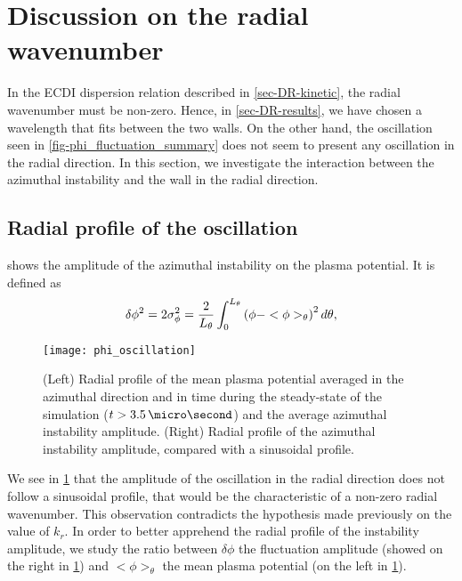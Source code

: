 
\section{ Discussion on the radial wavenumber}
  \label{sec-DR-BC}
    
  In the \ac{ECDI} dispersion relation described in \cref{sec-DR-kinetic}, the radial wavenumber must be non-zero.
  Hence, in \cref{sec-DR-results}, we have chosen a wavelength that fits between the two walls.
  On the other hand, the oscillation seen in \cref{fig-phi_fluctuation_summary} does not seem to present any oscillation in the radial direction.
  In this section, we investigate the interaction between the azimuthal instability and the wall in the radial direction.
  
  \subsection{Radial profile of the oscillation} \label{subsec-radial_prof}
   shows the amplitude of the azimuthal instability on the plasma potential.
  It is defined as
  \begin{equation} \label{eq-stdphi}
    \delta \phi^2 = 2 \sigma_{\phi}^2 = \frac{{2}}{L_{\theta}} \int_0^{L_{\theta}} \left(  \phi - <\phi>_{\theta}  \right) ^2 d\theta,
  \end{equation}
  
  \begin{figure}[hbt]
    \centering
    \texttt{[image: phi\_oscillation]}
    \caption{(Left) Radial profile of the mean plasma potential averaged in the azimuthal direction  and in time during the steady-state of the simulation ($t > 3.5 \,\micro\second$) and the average azimuthal instability amplitude. (Right) Radial profile of the  azimuthal instability amplitude, compared with a sinusoidal profile. }
    \label{fig-phi_osci_profile}
  \end{figure}
  
  
  We see in \cref{fig-phi_osci_profile} that the amplitude of the oscillation in the radial direction does not follow a sinusoidal profile, that would be the characteristic of a non-zero radial wavenumber.
  This observation contradicts the hypothesis made previously on the value of $k_r$.
  In order to better apprehend the radial profile of the instability amplitude, we study the ratio between $\delta \phi$ the fluctuation amplitude (showed on the right in \cref{fig-phi_osci_profile}) and $<\phi>_{\theta}$  the mean plasma potential (on the left in \cref{fig-phi_osci_profile}).
  
